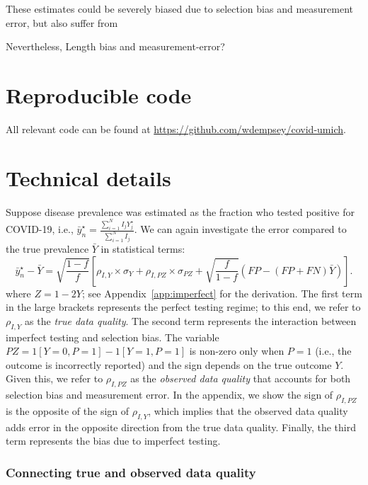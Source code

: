 \documentclass[11pt]{amsart}
\numberwithin{equation}{section}
\theoremstyle{plain}
\begin{document}
These estimates could be severely biased due to selection bias and measurement error, but also suffer from

Nevertheless,
Length bias and measurement-error?




\newpage
\appendix

\section{Reproducible code}

All relevant code can be found at \url{https://github.com/wdempsey/covid-umich}.

\section{Technical details}

Suppose disease prevalence was estimated as the fraction who tested positive for COVID-19, i.e., $\bar y_n^\star = \frac{\sum_{i=1}^N I_j Y_j^\star}{\sum_{i=1}^N I_j}$.  We can again investigate the error compared to the true prevalence $\bar Y$ in statistical terms:
$$
\bar y_n^\star - \bar Y = \sqrt{\frac{1-f}{f}} \left[ \rho_{I,Y} \times \sigma_Y + \rho_{I,PZ} \times \sigma_{PZ} + \sqrt{\frac{f}{1-f}}  \left( FP - (FP+FN) \bar Y \right) \right] .
$$
where $Z = 1-2Y$; see Appendix~\ref{app:imperfect} for the derivation. The first term in the large brackets represents the perfect testing regime; to this end, we refer to $\rho_{I,Y}$ as the \emph{true data quality}.  The second term represents the interaction between imperfect testing and selection bias. The variable $PZ = 1[Y=0,P=1] - 1[Y=1, P=1]$ is non-zero only when $P=1$ (i.e., the outcome is incorrectly reported) and the sign depends on the true outcome $Y$.  Given this, we refer to $\rho_{I,PZ}$ as the \emph{observed data quality} that accounts for both selection bias and measurement error.  In the appendix, we show the sign of $\rho_{I,PZ}$ is the opposite of the sign of $\rho_{I,Y}$, which implies that the observed data quality adds error in the opposite direction from the true data quality.  Finally, the third term represents the bias due to imperfect testing.

\subsubsection{Connecting true and observed data quality}
\end{document}
